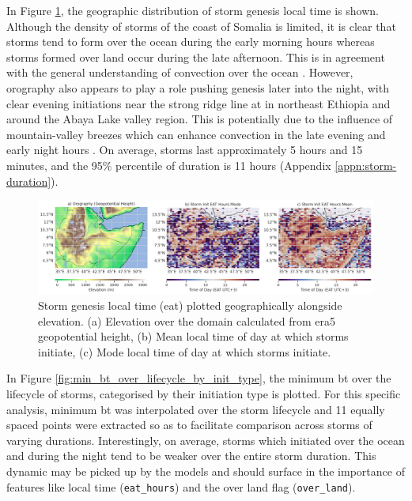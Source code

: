 In Figure \ref{fig:orography_storm_init_eat_hours_mode_mean}, the geographic distribution of storm genesis local time is shown. Although the density of storms of the coast of Somalia is limited, it is clear that storms tend to form over the ocean during the early morning hours whereas storms formed over land occur during the late afternoon. This is in agreement with the general understanding of convection over the ocean \citep{Hall1999,Houze2004}. However, orography also appears to play a role pushing genesis later into the night, with clear evening initiations near the strong ridge line at  in northeast Ethiopia and around the Abaya Lake valley region. This is potentially due to the influence of mountain-valley breezes which can enhance convection in the late evening and early night hours \citep{Zardi2013}. On average, storms last approximately 5 hours and 15 minutes, and the 95\% percentile of duration is 11 hours (Appendix \ref{appn:storm-duration}).

\begin{figure}[ht]
    \centering
    \includegraphics[width=\textwidth]{../figures/generated/exploration/orography_storm_init_eat_hours_mode_mean.png}
    \caption{Storm genesis local time (\acrlong{eat}) plotted geographically alongside elevation. (a) Elevation over the domain calculated from \acrshort{era5} geopotential height, (b) Mean local time of day at which storms initiate, (c) Mode local time of day at which storms initiate.}
    \label{fig:orography_storm_init_eat_hours_mode_mean}
\end{figure}

In Figure \ref{fig:min_bt_over_lifecycle_by_init_type}, the minimum \acrfull{bt} over the lifecycle of storms, categorised by their initiation type is plotted. For this specific analysis, minimum \acrshort{bt} was interpolated over the storm lifecycle and 11 equally spaced points were extracted so as to facilitate comparison across storms of varying durations. Interestingly, on average, storms which initiated over the ocean and during the night tend to be weaker over the entire storm duration. This dynamic may be picked up by the models and should surface in the importance of features like local time (\texttt{eat\_hours}) and the over land flag (\texttt{over\_land}). 

